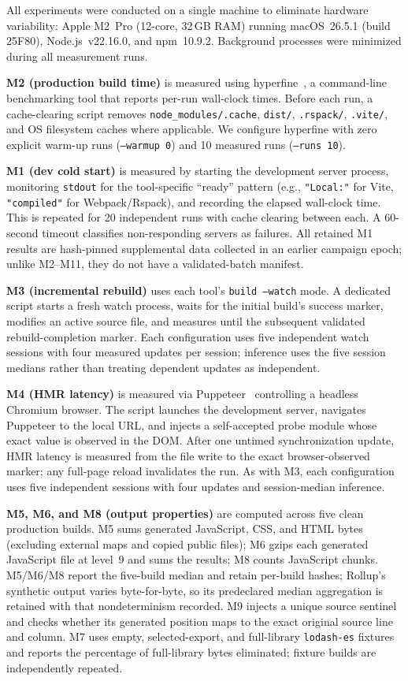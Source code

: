 \documentclass[preprint,12pt]{elsarticle}
\begin{document}
All experiments were conducted on a single machine to eliminate hardware variability: Apple M2~Pro (12-core, 32\,GB RAM) running macOS~26.5.1 (build 25F80), Node.js~v22.16.0, and npm~10.9.2.
Background processes were minimized during all measurement runs.

\textbf{M2 (production build time)} is measured using hyperfine~\cite{hyperfine2024}, a command-line benchmarking tool that reports per-run wall-clock times.
Before each run, a cache-clearing script removes \texttt{node\_modules/.cache}, \texttt{dist/}, \texttt{.rspack/}, \texttt{.vite/}, and OS filesystem caches where applicable.
We configure hyperfine with zero explicit warm-up runs (\texttt{--warmup 0}) and 10 measured runs (\texttt{--runs 10}).

\textbf{M1 (dev cold start)} is measured by starting the development server process, monitoring \texttt{stdout} for the tool-specific ``ready'' pattern (e.g., \texttt{"Local:"} for Vite, \texttt{"compiled"} for Webpack/Rspack), and recording the elapsed wall-clock time.
This is repeated for 20 independent runs with cache clearing between each.
A 60-second timeout classifies non-responding servers as failures.
All retained M1 results are hash-pinned supplemental data collected in an earlier campaign epoch; unlike M2--M11, they do not have a validated-batch manifest.

\textbf{M3 (incremental rebuild)} uses each tool's \texttt{build --watch} mode.
A dedicated script starts a fresh watch process, waits for the initial build's success marker, modifies an active source file, and measures until the subsequent validated rebuild-completion marker.
Each configuration uses five independent watch sessions with four measured updates per session; inference uses the five session medians rather than treating dependent updates as independent.

\textbf{M4 (HMR latency)} is measured via Puppeteer~\cite{puppeteer2024} controlling a headless Chromium browser.
The script launches the development server, navigates Puppeteer to the local URL, and injects a self-accepted probe module whose exact value is observed in the DOM.
After one untimed synchronization update, HMR latency is measured from the file write to the exact browser-observed marker; any full-page reload invalidates the run.
As with M3, each configuration uses five independent sessions with four updates and session-median inference.

\textbf{M5, M6, and M8 (output properties)} are computed across five clean production builds.
M5 sums generated JavaScript, CSS, and HTML bytes (excluding external maps and copied public files); M6 gzips each generated JavaScript file at level~9 and sums the results; M8 counts JavaScript chunks.
M5/M6/M8 report the five-build median and retain per-build hashes; Rollup's synthetic output varies byte-for-byte, so its predeclared median aggregation is retained with that nondeterminism recorded.
M9 injects a unique source sentinel and checks whether its generated position maps to the exact original source line and column.
M7 uses empty, selected-export, and full-library \texttt{lodash-es} fixtures and reports the percentage of full-library bytes eliminated; fixture builds are independently repeated.
\end{document}
